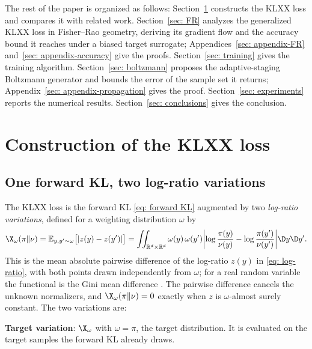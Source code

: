 \documentclass{article}
\begin{document}
The rest of the paper is organized as follows:
Section~\ref{sec: construction} constructs the KLXX loss and compares it with related work. Section~\ref{sec: FR} analyzes the generalized KLXX loss in Fisher--Rao geometry, deriving its gradient flow and the accuracy bound it reaches under a biased target surrogate; Appendices~\ref{sec: appendix-FR} and~\ref{sec: appendix-accuracy} give the proofs. Section~\ref{sec: training} gives the training algorithm. Section~\ref{sec: boltzmann} proposes the adaptive-staging Boltzmann generator and bounds the error of the sample set it returns; Appendix~\ref{sec: appendix-propagation} gives the proof. Section~\ref{sec: experiments} reports the numerical results. Section~\ref{sec: conclusions} gives the conclusion.


\section{Construction of the KLXX loss}
\label{sec: construction}

\subsection{One forward KL, two log-ratio variations}
\label{subsec: construction}

The KLXX loss is the forward KL \eqref{eq: forward KL} augmented by two \emph{log-ratio variations}, defined for a weighting distribution $\omega$ by
\begin{equation}
	\X_\omega(\pi\|\nu) = \mathbb E_{y,y'\sim \omega} \big[|z(y)-z(y')|\big] = \iint_{\mathbb R^d\times\mathbb R^d} \omega(y)\,\omega(y')
	\biggl|\log\frac{\pi(y)}{\nu(y)} - \log\frac{\pi(y')}{\nu(y')}\biggr| \D y\D y'.
	\label{eq: X}
\end{equation}
This is the mean absolute pairwise difference of the log-ratio $z(y)$ in \eqref{eq: log-ratio}, with both points drawn independently from $\omega$; for a real random variable the functional is the Gini mean difference \citep{yitzhaki2003gini}. The pairwise difference cancels the unknown normalizers, and $\X_\omega(\pi\|\nu)=0$ exactly when $z$ is $\omega$-almost surely constant. The two variations are:

\textbf{Target variation}: $\X_\omega$ with $\omega = \pi$, the target distribution. It is evaluated on the target samples the forward KL already draws.
\end{document}

